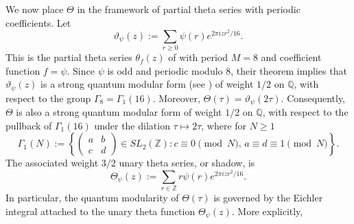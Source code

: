 \documentclass[10pt,a4paper]{amsart}
\newtheorem{proposition}{Proposition}
\numberwithin{equation}{section}
\begin{document}

We now place \(\Theta\) in the framework of partial theta series with periodic
coefficients.  Let
\[
\vartheta_{\psi}(z)
:=
\sum_{r\ge0}\psi(r)e^{2\pi i z r^2/16}.
\]
This is the partial theta series \(\theta_f(z)\) of \cite{Goswami-Osburn} with
period \(M=8\) and coefficient function \(f=\psi\).  Since \(\psi\) is odd and
periodic modulo \(8\), their theorem implies that \(\vartheta_{\psi}(z)\) is a
strong quantum modular form (see \cite[pp 453]{Goswami-Osburn}) of weight \(1/2\) on \(\mathbb Q\), with respect to
the group $\Gamma_8=\Gamma_1(16)$. Moreover, $\Theta(\tau)=\vartheta_{\psi}(2\tau)$. Consequently, \(\Theta\) is also a strong quantum modular form of weight
\(1/2\) on \(\mathbb Q\), with respect to the pullback of \(\Gamma_1(16)\) under
the dilation \(\tau\mapsto 2\tau\), where for $N\ge 1$
\begin{equation*}
\Gamma_1(N):=\left\{\begin{pmatrix}
a&b\\c&d    
\end{pmatrix}\in SL_2(\mathbb{Z}): c\equiv 0\!\!\pmod{N},\,a\equiv d\equiv 1\!\!\pmod{N}\right\}.    
\end{equation*}
The associated weight \(3/2\) unary theta series, or shadow, is
\begin{equation}\label{eq:shadow}
\Theta_{\psi}(z)
:=
\sum_{r\in\mathbb Z}r\psi(r)e^{2\pi i z r^2/16}.
\end{equation}
In particular, the quantum modularity of \(\Theta(\tau)\) is governed by the
Eichler integral attached to the unary theta function
\(\Theta_{\psi}(z)\).  More explicitly, 
\end{document}
